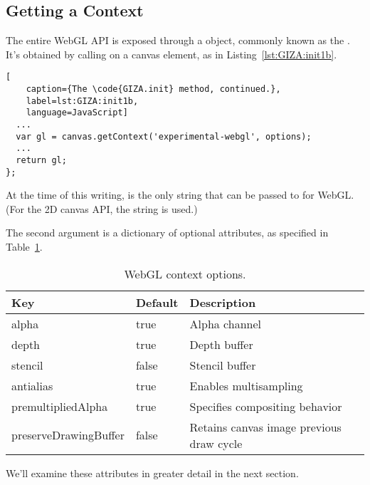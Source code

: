 \subsection{Getting a Context}
\label{sec:context}

The entire WebGL API is exposed through a   object, commonly known as the  .  It's obtained by calling   on a canvas element, as in Listing~\ref{lst:GIZA:init1b}.

\begin{lstlisting}[
    caption={The \code{GIZA.init} method, continued.},
    label=lst:GIZA:init1b,
    language=JavaScript]
  ...
  var gl = canvas.getContext('experimental-webgl', options);
  ...
  return gl;
};
\end{lstlisting}

At the time of this writing,   is the only string that can be passed to  for WebGL.  (For the 2D canvas API, the string  is used.)

The second argument is a dictionary of optional attributes, as specified in Table~\ref{tab:ContextAttributes}.

\begin{table}[htb]\centering
  \begin{tabular}{lll}
    \hline
    Key & Default & Description \\
    \hline
    alpha & true & Alpha channel \\
    depth & true & Depth buffer \\
    stencil & false & Stencil buffer \\
    antialias & true & Enables multisampling \\
    premultipliedAlpha & true & Specifies compositing behavior \\
    preserveDrawingBuffer & false & Retains canvas image previous draw cycle \\
    \hline
  \end{tabular}
  \caption{WebGL context options.}
  \label{tab:ContextAttributes}
\end{table}

We'll examine these attributes in greater detail in the next section.


